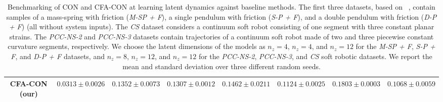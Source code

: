 \begin{landscape}
\begin{table}
\begin{scriptsize}
\begin{tabular}{c c c c c c c c}
         CFA-CON (our) & $0.0313 \pm 0.0026$ & $0.1352 \pm 0.0073$ & $\mathbf{0.1307 \pm 0.0012}$ & $0.1462 \pm 0.0211$ & $0.1124 \pm 0.0025$ & $0.1803 \pm 0.0003$ & $0.1068 \pm 0.0059$\\
         \bottomrule
    \end{tabular}
    \end{scriptsize}
    \caption{Benchmarking of \gls{CON} and \gls{CFA-CON} at learning latent dynamics against baseline methods. 
    The first three datasets, based on ~\citep{botev2021priors}, contain samples of a mass-spring with friction (\emph{M-SP + F}), a single pendulum with friction (\emph{S-P + F}), and a double pendulum with friction (\emph{D-P + F}) (all without system inputs).
    The \emph{CS} dataset considers a continuum soft robot consisting of one segment with three constant planar strains. The \emph{PCC-NS-2} and \emph{PCC-NS-3} datasets contain trajectories of a continuum soft robot made of two and three piecewise constant curvature segments, respectively.
    We choose the latent dimensions of the models as $n_z = 4$, $n_z = 4$, and $n_z = 12$ for the \emph{M-SP + F}, \emph{S-P + F}, and \emph{D-P + F} datasets, and  $n_z = 8$, $n_z = 12$, and $n_z = 12$ for the \emph{PCC-NS-2}, \emph{PCC-NS-3}, and \emph{CS} soft robotic datasets.
    We report the mean and standard deviation over three different random seeds.}
    \label{tab:con:latent_dynamics_results}
\end{table}


\end{landscape}
